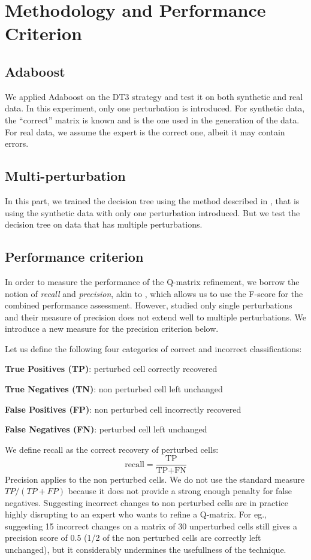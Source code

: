 \documentclass{edm_template}
\begin{document}
\section{Methodology and Performance Criterion}
\subsection{Adaboost}
We applied Adaboost on the DT3 strategy and test it on both synthetic and real data. In this experiment, only one perturbation is introduced.  For synthetic data, the ``correct'' matrix is known and is the one used in the generation of the data.  For real data, we assume the expert is the correct one, albeit it may contain errors.
\subsection{Multi-perturbation}
In this part, we trained the decision tree using the method described in , that is using the synthetic data with only one perturbation introduced. But we test the decision tree on data that has multiple perturbations.
\subsection{Performance criterion}
In order to measure the performance of the Q-matrix refinement, we borrow the notion of \textit{recall} and \textit{precision}, akin to , which allows us to use the F-score for the combined performance assessment. However,  studied only single perturbations and their measure of precision does not extend well to multiple perturbations. We introduce a new measure for the precision criterion below.

Let us define the following four categories of correct and incorrect classifications:
\begin{compactitem}
\item \textbf{True Positives (TP)}: perturbed cell correctly recovered
\item \textbf{True Negatives (TN)}: non perturbed cell left unchanged
\item \textbf{False Positives (FP)}: non perturbed cell incorrectly recovered
\item \textbf{False Negatives (FN)}: perturbed cell left unchanged
\end{compactitem}
We define recall as the correct recovery of perturbed cells:
 $$ \mathrm{recall}=\frac{\textrm{TP}}{\textrm{TP}+\textrm{FN}}$$
Precision applies to the non perturbed cells.  We do not use the standard measure $TP / (TP + FP)$ because it does not provide a strong enough penalty for false negatives. Suggesting incorrect changes to non perturbed cells are in practice highly disrupting to an expert who wants to refine a Q-matrix.  For eg., suggesting 15 incorrect changes on a matrix of 30 unperturbed cells still gives a precision score of 0.5 (1/2 of the non perturbed cells are correctly left unchanged), but it considerably undermines the usefullness of the technique.
\end{document}
